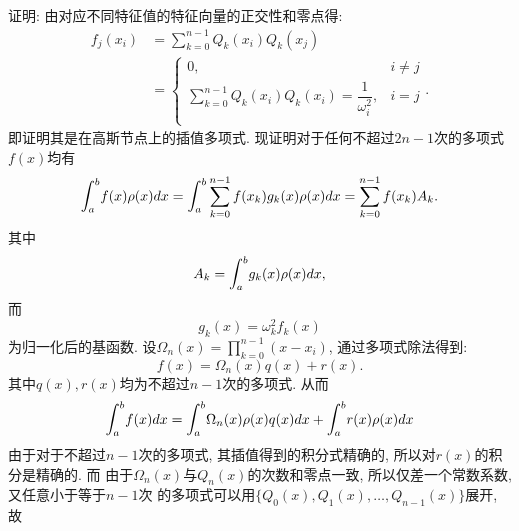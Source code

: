 \documentclass[UTF8]{ctexart}
\newcommand{\lint}{\mathlarger{\int}}
\begin{document}
        \subsection{}
            \indent 证明: 由对应不同特征值的特征向量的正交性和零点得:
            \begin{equation}
                \begin{array}{ll}
                    f_j(x_i)&=\sum\limits_{k=0}^{n-1}Q_k(x_i)Q_k(x_j)\\
                    &=
                    \left\{
                    \begin{array}{cc}
                        0,&i\neq j\\
                        \sum\limits_{k=0}^{n-1}Q_k(x_i)Q_k(x_i)=\dfrac{1}{\omega_i^2},&i=j\\
                    \end{array}
                    \right..
                \end{array}
            \end{equation}
            即证明其是在高斯节点上的插值多项式. 现证明对于任何不超过$2n-1$次的多项式$f(x)$均有
            \begin{equation}
                \lint_a^bf(x)\rho(x)dx=\lint_a^b\sum\limits_{k=0}^{n-1}f(x_k)g_k(x)\rho(x)dx=\sum\limits_{k=0}^{n-1}f(x_k)A_k.
            \end{equation}
            其中
            \begin{equation}
                A_k=\lint_a^bg_k(x)\rho(x)dx,
            \end{equation}
            而
            \begin{equation}
                g_k(x)=\omega_k^2f_k(x)
            \end{equation}
            为归一化后的基函数. 设$\Omega_n(x)=\prod\limits_{k=0}^{n-1}(x-x_i)$, 通过多项式除法得到:
            \begin{equation}
                f(x)=\Omega_n(x)q(x)+r(x).
            \end{equation}
            其中$q(x), r(x)$均为不超过$n-1$次的多项式. 从而
            \begin{equation}
                \lint_a^bf(x)dx=\lint_a^b\Omega_n(x)\rho(x)q(x)dx+\lint_a^br(x)\rho(x)dx
            \end{equation}
            由于对于不超过$n-1$次的多项式, 其插值得到的积分式精确的, 所以对$r(x)$的积分是精确的. 而
            由于$\Omega_n(x)$与$Q_n(x)$的次数和零点一致, 所以仅差一个常数系数, 又任意小于等于$n-1$次
            的多项式可以用$\{Q_0(x),Q_1(x),\dots,Q_{n-1}(x)\}$展开, 故
\end{document}
